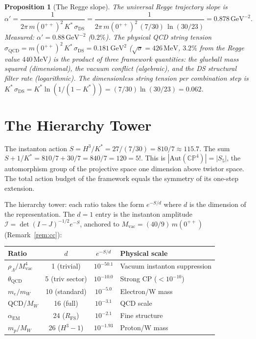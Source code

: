 \documentclass[11pt,a4paper]{article}
\newtheorem{proposition}[theorem]{Proposition}
\theoremstyle{definition}
\theoremstyle{remark}
\newcommand{\CP}{\mathbb{CP}}
\begin{document}
\begin{proposition}[The Regge slope]\label{prop:regge}
The universal Regge trajectory slope is
\begin{equation}\label{eq:regge}
\alpha'=\frac{1}{2\pi\,m(0^{++})^2\,K^*\,\sigma_{\mathrm{DS}}}=\frac{1}{2\pi\,m(0^{++})^2\,(7/30)\,\ln(30/23)}=0.878\,\mathrm{GeV}^{-2}.
\end{equation}
Measured: $\alpha'=0.88\,\mathrm{GeV}^{-2}$ ($0.2\%$). The physical QCD string tension $\sigma_{\mathrm{QCD}}=m(0^{++})^2\,K^*\,\sigma_{\mathrm{DS}}=0.181\,\mathrm{GeV}^2$ ($\sqrt{\sigma}=426\,\mathrm{MeV}$, $3.2\%$ from the Regge value $440\,\mathrm{MeV}$) is the product of three framework quantities: the glueball mass squared (dimensional), the vacuum conflict (algebraic), and the DS structural filter rate (logarithmic). The dimensionless string tension per combination step is $K^*\,\sigma_{\mathrm{DS}}=K^*\ln(1/(1-K^*))=(7/30)\ln(30/23)=0.062$.
\end{proposition}


\section{The Hierarchy Tower}\label{sec:hierarchy}

The instanton action $S = H^3/K^* = 27/(7/30) = 810/7 \approx 115.7$. The sum $S + 1/K^* = 810/7 + 30/7 = 840/7 = 120 = 5!$. This is $|\mathrm{Aut}(\CP^4)| = |S_5|$, the automorphism group of the projective space one dimension above twistor space. The total action budget of the framework equals the symmetry of its one-step extension.

The hierarchy tower: each ratio takes the form $e^{-S/d}$ where $d$ is the dimension of the representation. The $d=1$ entry is the instanton amplitude $\mathcal{I}=\det(I-J)^{-1/2}e^{-S}$, anchored to $M_{\mathrm{vac}}=(40/9)\,m(0^{++})$ (Remark~\ref{rem:cc}):

\begin{center}
\begin{tabular}{lccl}
\toprule
Ratio & $d$ & $e^{-S/d}$ & Physical scale \\
\midrule
$\rho_\Lambda/M_{\mathrm{vac}}^4$ & 1 (trivial) & $10^{-50.1}$ & Vacuum instanton suppression \\
$\theta_{\mathrm{QCD}}$ & 5 (triv sector) & $10^{-10.0}$ & Strong CP ($< 10^{-10}$) \\
$m_e/m_W$ & 10 (standard) & $10^{-5.0}$ & Electron/W mass \\
QCD/$M_W$ & 16 (full) & $10^{-3.1}$ & QCD scale \\
$\alpha_{\mathrm{EM}}$ & 24 ($R_{\mathrm{FS}}$) & $10^{-2.1}$ & Fine structure \\
$m_p/M_W$ & 26 ($H^3-1$) & $10^{-1.93}$ & Proton/W mass \\
\bottomrule
\end{tabular}
\end{center}
\end{document}

